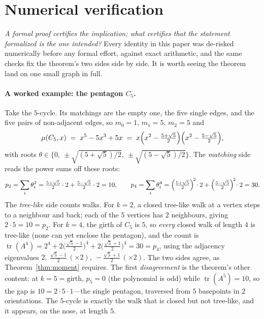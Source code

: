\documentclass[11pt]{article}
\DeclareMathOperator{\tr}{tr}
\begin{document}
\section{Numerical verification}
\label{sec:numeric}

\emph{A formal proof certifies the implication; what certifies that the statement formalized is the
one intended?} Every identity in this paper was de-risked numerically before any formal effort,
against exact arithmetic, and the same checks fix the theorem's two sides side by side. It is worth
seeing the theorem land on one small graph in full.

\paragraph{A worked example: the pentagon $C_5$.} Take the $5$-cycle. Its matchings are the empty one,
the five single edges, and the five pairs of non-adjacent edges, so $m_0=1,\,m_1=5,\,m_2=5$ and
\[
  \mu(C_5,x)\;=\;x^5-5x^3+5x\;=\;x\Bigl(x^2-\tfrac{5+\sqrt5}{2}\Bigr)\Bigl(x^2-\tfrac{5-\sqrt5}{2}\Bigr),
\]
with roots $\theta\in\bigl\{0,\ \pm\sqrt{(5+\sqrt5)/2},\ \pm\sqrt{(5-\sqrt5)/2}\bigr\}$. The
\emph{matching} side reads the power sums off these roots:
\[
  p_2=\sum_i\theta_i^2=\tfrac{5+\sqrt5}{2}\cdot2+\tfrac{5-\sqrt5}{2}\cdot2=10,
  \qquad
  p_4=\sum_i\theta_i^4=\Bigl(\tfrac{5+\sqrt5}{2}\Bigr)^{\!2}\!\cdot2+\Bigl(\tfrac{5-\sqrt5}{2}\Bigr)^{\!2}\!\cdot2=30.
\]
The \emph{tree-like} side counts walks. For $k=2$, a closed tree-like walk at a vertex steps to a
neighbour and back; each of the $5$ vertices has $2$ neighbours, giving $2\cdot5=10=p_2$. For $k=4$,
the girth of $C_5$ is $5$, so \emph{every} closed walk of length $4$ is tree-like (none can yet
enclose the pentagon), and the count is $\tr(A^4)=2^4+2\bigl(\tfrac{\sqrt5-1}{2}\bigr)^4+2\bigl(\tfrac{\sqrt5+1}{2}\bigr)^4=30=p_4$,
using the adjacency eigenvalues $2,\ \tfrac{\sqrt5-1}{2}\,(\times2),\ -\tfrac{\sqrt5+1}{2}\,(\times2)$.
The two sides agree, as Theorem~\ref{thm:moment} requires. The first \emph{disagreement} is the
theorem's other content: at $k=5=\mathrm{girth}$, $p_5=0$ (the polynomial is odd) while
$\tr(A^5)=10$, so the gap is $10=2\cdot5\cdot1$---the single pentagon, traversed from $5$ basepoints in
$2$ orientations. The $5$-cycle is exactly the walk that is closed but not tree-like, and it appears,
on the nose, at length $5$.
\end{document}

